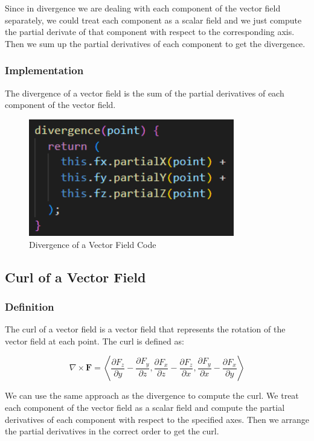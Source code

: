 \documentclass[12pt]{article}
\begin{document}
Since in divergence we are dealing with each component of the vector field separately, we could treat each component as a scalar field and we just compute the partial derivate of that component with respect to the corresponding axis.
Then we sum up the partial derivatives of each component to get the divergence.

\subsubsection{Implementation}

The divergence of a vector field is the sum of the partial derivatives of each component of the vector field.

\begin{figure}[H]
    \centering
    \includegraphics[width=0.8\textwidth]{images/div.png}
    \caption{Divergence of a Vector Field Code\cite{El-Deeb_PEU-218_Stokes_Threejs}}
\end{figure}

\subsection{Curl of a Vector Field}

\subsubsection{Definition}

The curl of a vector field is a vector field that represents the rotation of the vector field at each point. The curl is defined as:

\[
    \nabla \times \mathbf{F} = \left\langle \frac{\partial F_z}{\partial y} - \frac{\partial F_y}{\partial z}, \frac{\partial F_x}{\partial z} - \frac{\partial F_z}{\partial x}, \frac{\partial F_y}{\partial x} - \frac{\partial F_x}{\partial y}\right\rangle
\]

We can use the same approach as the divergence to compute the curl. We treat each component of the vector field as a scalar field and compute the partial derivatives of each component with respect to the specified axes.
Then we arrange the partial derivatives in the correct order to get the curl.
\end{document}
